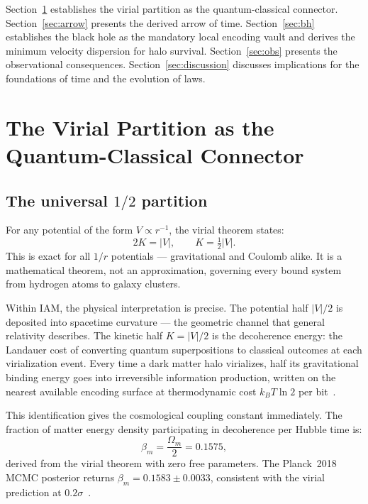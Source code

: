 \documentclass[12pt,a4paper]{article}
\begin{document}
Section~\ref{sec:virial} establishes the virial partition as the
quantum-classical connector. Section~\ref{sec:arrow} presents the derived
arrow of time. Section~\ref{sec:bh} establishes the black hole as the
mandatory local encoding vault and derives the minimum velocity dispersion
for halo survival. Section~\ref{sec:obs} presents the observational
consequences. Section~\ref{sec:discussion} discusses implications for
the foundations of time and the evolution of laws.

\section{The Virial Partition as the Quantum-Classical Connector}
\label{sec:virial}

\subsection{The universal $1/2$ partition}

For any potential of the form $V \propto r^{-1}$, the virial theorem
states:
\begin{equation}
2K = |V|, \qquad K = \tfrac{1}{2}|V|.
\label{eq:virial}
\end{equation}
This is exact for all $1/r$ potentials --- gravitational and Coulomb alike.
It is a mathematical theorem, not an approximation, governing every bound
system from hydrogen atoms to galaxy clusters.

Within IAM, the physical interpretation is precise. The potential half
$|V|/2$ is deposited into spacetime curvature --- the geometric channel
that general relativity describes. The kinetic half $K = |V|/2$ is the
decoherence energy: the Landauer cost of converting quantum superpositions
to classical outcomes at each virialization event. Every time a dark matter
halo virializes, half its gravitational binding energy goes into irreversible
information production, written on the nearest available encoding surface
at thermodynamic cost $k_B T \ln 2$ per bit~\citep{Landauer1961}.

This identification gives the cosmological coupling constant immediately.
The fraction of matter energy density participating in decoherence per
Hubble time is:
\begin{equation}
\beta_m = \frac{\Omega_m}{2} = 0.1575,
\label{eq:beta}
\end{equation}
derived from the virial theorem with zero free parameters. The Planck~2018
MCMC posterior returns $\beta_m = 0.1583 \pm 0.0033$, consistent with the
virial prediction at $0.2\sigma$~\citep{IAM_obs}.
\end{document}
